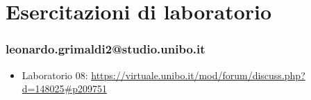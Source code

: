\documentclass[a4paper,12pt]{report}
\begin{document}
\chapter{Esercitazioni di laboratorio}
\subsection{leonardo.grimaldi2@studio.unibo.it}

\begin{itemize}
 \item Laboratorio 08: \url{https://virtuale.unibo.it/mod/forum/discuss.php?d=148025#p209751}
\end{itemize}



\end{document}
